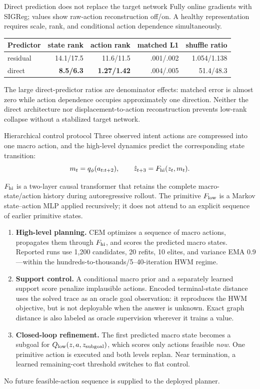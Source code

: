 \documentclass[aspectratio=169,10pt]{beamer}
\newcommand{\bad}[1]{\textcolor{cred}{\textbf{#1}}}
\begin{document}
\begin{frame}{Direct prediction does not replace the target network}
\small
Fully online gradients with SIGReg; values show raw-action reconstruction
off/on. A healthy representation requires scale, rank, and conditional action
dependence simultaneously.

\medskip
\centering
\begin{tabular}{lrrrr}
\toprule
Predictor & state rank & action rank & matched L1 & shuffle ratio\\
\midrule
residual & 14.1/17.5 & 11.6/11.5 & .001/.002 & 1.054/1.138\\
direct & \bad{8.5/6.3} & \bad{1.27/1.42} & .004/.005 & 51.4/48.3\\
\bottomrule
\end{tabular}

\medskip
The large direct-predictor ratios are denominator effects: matched error is
almost zero while action dependence occupies approximately one direction.
Neither the direct architecture nor displacement-to-action reconstruction
prevents low-rank collapse without a stabilized target network.
\end{frame}

\begin{frame}{Hierarchical control protocol}
\small
Three observed intent actions are compressed into one macro action,
and the high-level dynamics predict the corresponding state transition:
\[
m_t=q_\phi(a_{t:t+2}),\qquad
\hat z_{t+3}=F_{\rm hi}(z_t,m_t).
\]

$F_{\rm hi}$ is a two-layer causal transformer that retains the complete
macro-state/action history during autoregressive rollout. The primitive
$F_{\rm low}$ is a Markov state--action MLP applied recursively; it does not
attend to an explicit sequence of earlier primitive states.

\begin{enumerate}\itemsep2pt
\item \textbf{High-level planning.} CEM optimizes a sequence of macro actions,
propagates them through $F_{\rm hi}$, and scores the predicted macro states.
Reported runs use 1,200 candidates, 20 refits, 10 elites, and variance EMA
0.9---within the hundreds-to-thousands/5--40-iteration HWM regime.
\item \textbf{Support control.} A conditional macro prior and a separately
learned support score penalize implausible actions. Encoded terminal-state
distance uses the solved trace as an oracle goal observation: it reproduces
the HWM objective, but is not deployable when the answer is unknown. Exact
graph distance is also labeled as oracle supervision wherever it trains a value.
\item \textbf{Closed-loop refinement.} The first predicted macro state becomes
a subgoal for $Q_{\rm low}(z,a,z_{\rm subgoal})$, which scores only actions
feasible \emph{now}. One primitive action is executed and both levels replan.
Near termination, a learned remaining-cost threshold switches to flat control.
\end{enumerate}

No future feasible-action sequence is supplied to the deployed planner.
\end{frame}
\end{document}
